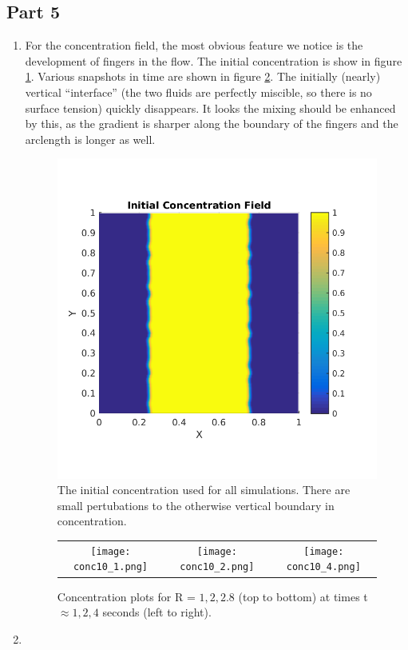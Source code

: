 \documentclass{article}
\begin{document}
\subsection{Part 5}
\begin{enumerate}
\item For the concentration field, the most obvious feature we notice is the development of fingers in the flow.
The initial concentration is show in figure \ref{fig:initial-conc}.
Various snapshots in time are shown in figure \ref{fig:conc}.
The initially (nearly) vertical ``interface'' (the two fluids are perfectly miscible, so there is no surface tension) quickly disappears.
It looks the mixing should be enhanced by this, as the gradient is sharper along the boundary of the fingers and the arclength is longer as well.

\begin{figure}[!ht]
\centering
\includegraphics[scale=1.0]{initial_conc.png}
\caption{The initial concentration used for all simulations. There are small pertubations to the otherwise vertical boundary in concentration.}
\label{fig:initial-conc}
\end{figure}

\begin{figure}[!ht]
\centering
\begin{tabular}{c c c}
\texttt{[image: conc10\_1.png]} &
\texttt{[image: conc10\_2.png]} &
\texttt{[image: conc10\_4.png]} &
\end{tabular}
\caption{Concentration plots for R = $1, 2, 2.8$ (top to bottom) at times t $\approx 1, 2, 4$ seconds (left to right).}
\label{fig:conc}
\end{figure}

\item
\end{enumerate}
\end{document}
